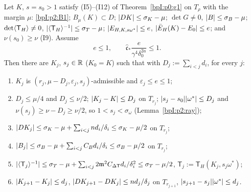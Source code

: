 \begin{proposition}\label{bpI:p2:iteration}
Let $K$, $s=s_0>1$ satisfy (I5)--(I12) of Theorem~\ref{bpI:p0:g1} on $T_\rho$ with the margin $\mu$: \ref{bpI:p2:B1}; $B_\mu(K)\subset D$; $\lvert DK\rvert\le\sigma_K-\mu$; $\det G\ne0$, $\lvert B\rvert\le\sigma_B-\mu$; $\det\langle \mathsf T_H\rangle\ne0$, $\lvert \langle \mathsf T_H\rangle^{-1}\rvert\le\sigma_T-\mu$; $\lvert E_{H,K,s\omega^*}\rvert\le e$, $\lvert \bar E_H(K)-E_0\rvert\le e$; and $\nu(s_0)\ge\nu$ (I9). Assume
\[
e\le1,\qquad\hat{\mathfrak c}_*\frac e{\gamma^4\delta_0^{2a}}\le1.
\]
Then there are $K_j$, $s_j\in\mathbb{R}$ ($K_0=K$) such that with $D_j:=\sum_{i<j}d_i$, for every $j$:
\begin{enumerate}[label=(\roman*)]
\item $K_j$ is $(r_j,\mu-D_j,\varepsilon_j,s_j)$-admissible and $\varepsilon_j\le e\le1$;
\item $D_j\le\mu/4$ and $D_j\le\nu/2$; $\lvert K_j-K\rvert\le D_j$ on $T_{r_j}$; $\lvert s_j-s_0\rvert\lvert \omega^*\rvert\le D_j$ and $\nu(s_j)\ge\nu-D_j\ge\nu/2$, so $1<s_j<\sigma_\omega$ (Lemma~\ref{bpI:p2:ray});
\item $\lvert DK_j\rvert\le\sigma_K-\mu+\sum_{i<j}nd_i/\delta_i\le\sigma_K-\mu/2$ on $T_{r_j}$;
\item $\lvert B_j\rvert\le\sigma_B-\mu+\sum_{i<j}C_Bd_i/\delta_i\le\sigma_B-\mu/2$ on $T_{r_j}$;
\item $\lvert \langle \mathsf T_j\rangle^{-1}\rvert\le\sigma_T-\mu+\sum_{i<j}2\mathfrak m^2C_{\Delta\mathsf T}d_i/\delta_i^2\le\sigma_T-\mu/2$, $\mathsf T_j:=\mathsf T_H(K_j,s_j\omega^*)$;
\item $\lvert K_{j+1}-K_j\rvert\le d_j$, $\lvert DK_{j+1}-DK_j\rvert\le nd_j/\delta_j$ on $T_{r_{j+1}}$, $\lvert s_{j+1}-s_j\rvert\lvert \omega^*\rvert\le d_j$.
\end{enumerate}
\end{proposition}
